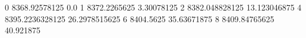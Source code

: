 0 8368.92578125 0.0
1 8372.2265625 3.30078125
2 8382.048828125 13.123046875
4 8395.2236328125 26.2978515625
6 8404.5625 35.63671875
8 8409.84765625 40.921875
